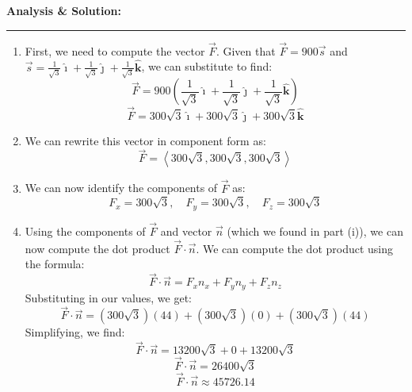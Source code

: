 \documentclass[12pt]{article} %
\numberwithin{equation}{section}
\begin{document}
\begin{enumerate}[label=\roman*.]
            \bigskip
            \hspace{0.5em}
            \textbf{Analysis \& Solution:}
            \begin{center}
            \rule{\linewidth}{1pt}
            \end{center}
            \begin{enumerate}[label=\arabic*.]
                \item First, we need to compute the vector \(\vec{F}\).
                    Given that \(\vec{F} = 900\vec{s}\) and \(\vec{s} = \frac{1}{\sqrt{3}}\boldsymbol{\hat{\imath}} + \frac{1}{\sqrt{3}}\boldsymbol{\hat{\jmath}} + \frac{1}{\sqrt{3}}\boldsymbol{\hat{k}}\), we can substitute to find:
                    \[
                    \vec{F} = 900\left(\frac{1}{\sqrt{3}}\boldsymbol{\hat{\imath}} + \frac{1}{\sqrt{3}}\boldsymbol{\hat{\jmath}} + \frac{1}{\sqrt{3}}\boldsymbol{\hat{k}}\right)
                    \]
                    \[
                    \vec{F} = 300\sqrt{3}\boldsymbol{\hat{\imath}} + 300\sqrt{3}\boldsymbol{\hat{\jmath}} + 300\sqrt{3}\boldsymbol{\hat{k}}
                    \]
                \item We can rewrite this vector in component form as:
                    \[
                    \vec{F} = \left\langle 300\sqrt{3}, 300\sqrt{3}, 300\sqrt{3} \right\rangle
                    \]
                \item We can now identify the components of \(\vec{F}\) as:
                    \[
                    F_x = 300\sqrt{3}, \quad F_y = 300\sqrt{3}, \quad F_z = 300\sqrt{3}
                    \]
                \item Using the components of \(\vec{F}\) and vector \(\vec{n}\) (which we found in part (i)), we can now compute the dot product \(\vec{F} \cdotp \vec{n}\).
                    We can compute the dot product using the formula:
                    \[
                    \vec{F} \cdotp \vec{n} = F_x n_x + F_y n_y + F_z n_z
                    \]
                    Substituting in our values, we get:
                    \[
                    \vec{F} \cdotp \vec{n} = (300\sqrt{3})(44) + (300\sqrt{3})(0) + (300\sqrt{3})(44)
                    \]
                    Simplifying, we find:
                    \[
                    \vec{F} \cdotp \vec{n} = 13200\sqrt{3} + 0 + 13200\sqrt{3}
                    \]
                    \[
                    \vec{F} \cdotp \vec{n} = 26400\sqrt{3}
                    \]
                    \[
                    \boxed{\vec{F} \cdotp \vec{n} \approx 45726.14}
\]
\end{enumerate}
\end{enumerate}
\end{document}
